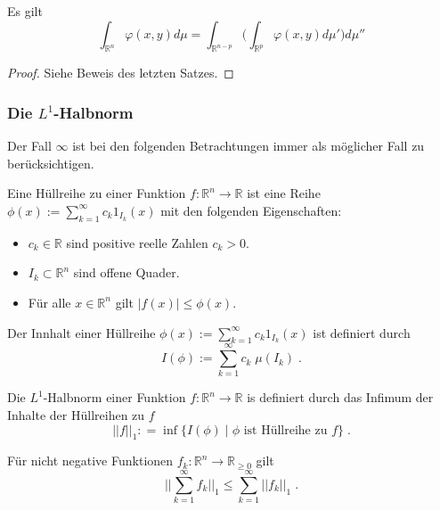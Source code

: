 \begin{Bemerkung}
\label{FTF}
Es gilt $$\int_{\mathbb{R}^n} \varphi(x,y) d \mu = \int_{\mathbb{R}^{n-p}} \biggl (\int_{\mathbb{R}^{p}}  \varphi(x,y) d \mu' \biggr ) d \mu''$$
\end{Bemerkung}
\begin{proof}
Siehe Beweis des letzten Satzes.
\end{proof}


\subsubsection{Die $L^1$-Halbnorm}
Der Fall $\infty$ ist bei den folgenden Betrachtungen immer als möglicher Fall zu berücksichtigen.

\begin{Definition}
Eine Hüllreihe zu einer Funktion $f :\mathbb{R}^n \to \mathbb{R}$ ist eine Reihe $\phi(x):= \sum_{k=1}^{\infty} c_k  1_{I_k} (x)$ mit den folgenden Eigenschaften:
\begin{itemize}
\item $c_k \in \mathbb{R}$ sind positive reelle Zahlen $c_k >0$.
\item $I_k \subset \mathbb{R}^n$ sind offene Quader.
\item Für alle $x \in \mathbb{R}^n$ gilt $|f(x) | \leq \phi(x)$.
\end{itemize}
\end{Definition}


\begin{Definition}
Der Innhalt einer Hüllreihe $\phi(x):= \sum_{k=1}^{\infty} c_k  1_{I_k} (x)$ ist definiert durch 
$$I (\phi) := \sum_{k=1}^{\infty} c_k \;  \mu(I_k) \; .$$
\end{Definition}


\begin{Definition}
Die $L^1$-Halbnorm einer Funktion $f :\mathbb{R}^n \to \mathbb{R}$ is definiert durch das Infimum der Inhalte der Hüllreihen zu $f$
$$ || f ||_1 : = \inf  \biggl \{   I(\phi) \; | \; \phi  \text{ ist Hüllreihe zu  }  f \biggr \} \; .$$
\end{Definition}

\begin{Lemma}
\label{vdug} 
Für nicht negative Funktionen $f_k  :\mathbb{R}^n \to \mathbb{R}_{\geq 0}$ gilt
$$ \biggl | \biggl | \sum_{k=1}^{\infty} f_k \biggr | \biggr |_1 \leq  \sum_{k=1}^{\infty} || f_k  ||_1 \; .$$
\end{Lemma}

